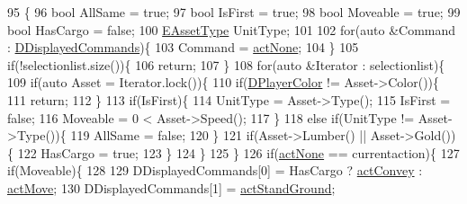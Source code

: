 \begin{DoxyCode}
95                                                                                                            
                                                         \{
96     \textcolor{keywordtype}{bool} AllSame = \textcolor{keyword}{true};
97     \textcolor{keywordtype}{bool} IsFirst = \textcolor{keyword}{true};
98     \textcolor{keywordtype}{bool} Moveable = \textcolor{keyword}{true};
99     \textcolor{keywordtype}{bool} HasCargo = \textcolor{keyword}{false};
100     \hyperlink{GameDataTypes_8h_a5600d4fc433b83300308921974477fec}{EAssetType} UnitType;
101     
102     \textcolor{keywordflow}{for}(\textcolor{keyword}{auto} &Command : \hyperlink{classCUnitActionRenderer_a194c87c9f3280485f4abceb8d39853b3}{DDisplayedCommands})\{
103         Command = \hyperlink{GameDataTypes_8h_a35b98ce26aca678b03c6f9f76e4778ceaa8df154ad276f6f62054e9b5b0696f92}{actNone};    
104     \}
105     \textcolor{keywordflow}{if}(!selectionlist.size())\{
106         \textcolor{keywordflow}{return};    
107     \}
108     \textcolor{keywordflow}{for}(\textcolor{keyword}{auto} &Iterator : selectionlist)\{
109         \textcolor{keywordflow}{if}(\textcolor{keyword}{auto} Asset = Iterator.lock())\{
110             \textcolor{keywordflow}{if}(\hyperlink{classCUnitActionRenderer_a092d5c46d431f75499b194dc7b385ceb}{DPlayerColor} != Asset->Color())\{
111                 \textcolor{keywordflow}{return};   
112             \}
113             \textcolor{keywordflow}{if}(IsFirst)\{
114                 UnitType = Asset->Type();     
115                 IsFirst = \textcolor{keyword}{false};
116                 Moveable = 0 < Asset->Speed();
117             \}
118             \textcolor{keywordflow}{else} \textcolor{keywordflow}{if}(UnitType != Asset->Type())\{
119                 AllSame = \textcolor{keyword}{false};   
120             \}
121             \textcolor{keywordflow}{if}(Asset->Lumber() || Asset->Gold())\{
122                 HasCargo = \textcolor{keyword}{true};      
123             \}
124         \}
125     \}
126     \textcolor{keywordflow}{if}(\hyperlink{GameDataTypes_8h_a35b98ce26aca678b03c6f9f76e4778ceaa8df154ad276f6f62054e9b5b0696f92}{actNone} == currentaction)\{
127         \textcolor{keywordflow}{if}(Moveable)\{
128 
129             DDisplayedCommands[0] = HasCargo ? \hyperlink{GameDataTypes_8h_a35b98ce26aca678b03c6f9f76e4778cead52ccba78becf1f7411bcea19f1276a8}{actConvey} : \hyperlink{GameDataTypes_8h_a35b98ce26aca678b03c6f9f76e4778ceaac071f5baee87f2a5ce94c03750a44af}{actMove};
130             DDisplayedCommands[1] = \hyperlink{GameDataTypes_8h_a35b98ce26aca678b03c6f9f76e4778cea60ecb1b155c04190174a46d8053b5a04}{actStandGround};

\end{DoxyCode}
